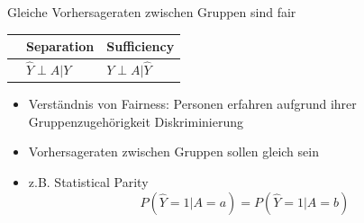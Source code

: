 \documentclass[aspectratio=169]{beamer}
\begin{document}
\begin{frame}[t]{Gleiche Vorhersageraten zwischen Gruppen sind fair} %
	\begin{table}
        \begin{tabular}{lll}
            \toprule
            \color{orange}{Independence} & Separation & Sufficiency \\
            \midrule
            \color{orange}{$\hat{Y} \perp A$} & $\hat{Y} \perp A | Y$ & $Y \perp A | \hat{Y}$\\
            \bottomrule
        \end{tabular}
    \end{table}
	\begin{itemize}
		\item<2-> Verständnis von Fairness: Personen erfahren aufgrund ihrer Gruppenzugehörigkeit Diskriminierung
		\item<3-> Vorhersageraten zwischen Gruppen sollen gleich sein
		\item<4-> z.B. Statistical Parity \cite{verma2018} 	$$P(\hat{Y} = 1 | A = a) = P(\hat{Y} = 1 | A = b)$$ %
	\end{itemize}
\end{frame}
\end{document}
